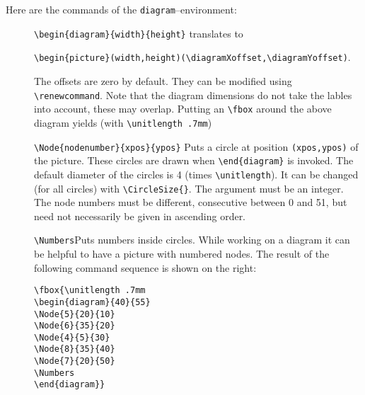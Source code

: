\documentclass[12pt]{article}
\begin{document}
Here are the commands of the \texttt{diagram}--environment:
\begin{description}
\item[]\verb|\begin{diagram}{width}{height}|\quad
translates to \par
\verb|\begin{picture}(width,height)(\diagramXoffset,\diagramYoffset)|.


The offsets are zero by default. They can be modified using
\verb|\renewcommand|. Note that the diagram dimensions do not take the lables
into account, these may overlap. Putting an \verb|\fbox| around the above
diagram yields (with \verb|\unitlength .7mm|)
\begin{center}
  \end{center}
\item[]\verb|\Node{nodenumber}{xpos}{ypos}|\quad
Puts a circle at position \texttt{(xpos,ypos)} of the picture. 
These circles are drawn when \verb|\end{diagram}| is invoked. The default
diameter of the circles is 4 (times \verb|\unitlength|). It can be changed
(for all circles) with \verb|\CircleSize{}|. The argument must be an integer.
The node numbers must be different, consecutive between 0 and 51, but need not
necessarily be given in ascending order. 

\item[]\verb|\Numbers|\quad Puts numbers inside circles.  While working on a
  diagram it can be helpful to have a picture with numbered 
nodes. The result of the following command sequence is shown on the right:

\begin{minipage}{.6\textwidth}
\begin{verbatim}
\fbox{\unitlength .7mm
\begin{diagram}{40}{55}
\Node{5}{20}{10}
\Node{6}{35}{20}
\Node{4}{5}{30}
\Node{8}{35}{40}
\Node{7}{20}{50}
\Numbers
\end{diagram}}
\end{verbatim}
\end{minipage} \hfill
\begin{minipage}{.25\textwidth}
\end{minipage}


\end{description}
\end{document}
